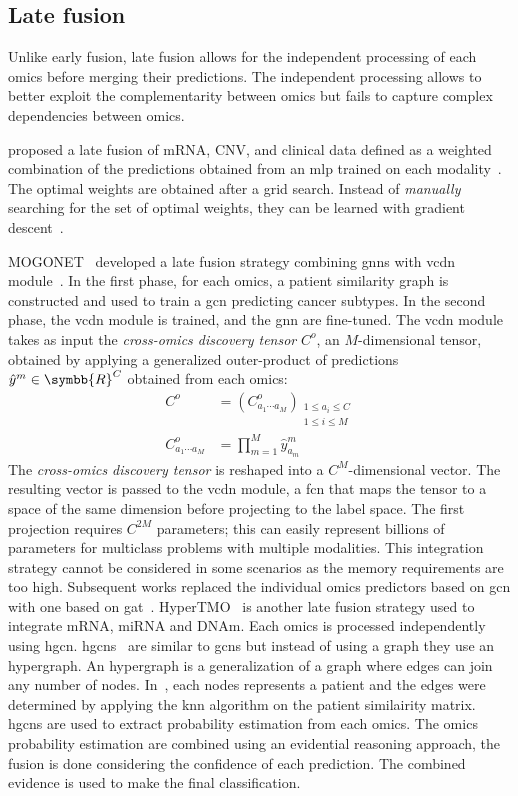 \documentclass[../main.tex]{subfiles}
\begin{document}
	\subsection{Late fusion}
		Unlike early fusion, late fusion allows for the independent processing of each omics before merging their predictions.
		The independent processing allows to better exploit the complementarity between omics but fails to capture complex dependencies between omics.

		\citeauthor{Sun2019} proposed a late fusion of mRNA, CNV, and clinical data defined as a weighted combination of the predictions obtained from an \gls{mlp} trained on each modality~\cite{Sun2019}.
		The optimal weights are obtained after a grid search.
		Instead of \emph{manually} searching for the set of optimal weights, they can be learned with gradient descent~\cite{CarrilloPerez2022}.

		MOGONET~\cite{MOGONET} developed a late fusion strategy combining \glspl{gnn} with \gls{vcdn} module~\cite{VCDN}.
		In the first phase, for each omics, a patient similarity graph is constructed and used to train a \gls{gcn} predicting cancer subtypes.
		In the second phase, the \gls{vcdn} module is trained, and the \gls{gnn} are fine-tuned.
		The \gls{vcdn} module takes as input the \emph{cross-omics discovery tensor} \(C^{o}\), an \(M\)-dimensional tensor, obtained by applying a generalized outer-product of predictions \(\hat{y}^{m} \in \symbb{R}^{C}\) obtained from each omics:
		\begin{align*}
			C^{o}                     & = {\left(C^{o}_{a_{1}\cdots a_{M}}\right)}_{\substack{1 \leq a_{i} \leq C \\ 1 \leq i \leq M}} \\
			C^{o}_{a_{1}\cdots a_{M}} & = \prod_{m=1}^{M}\hat{y}_{a_{m}}^{m}
		\end{align*}
		The \emph{cross-omics discovery tensor} is reshaped into a \(C^{M}\)-dimensional vector.
		The resulting vector is passed to the \gls{vcdn} module, a \gls{fcn} that maps the tensor to a space of the same dimension before projecting to the label space.
		The first projection requires \(C^{2M}\) parameters; this can easily represent billions of parameters for multiclass problems with multiple modalities.
		This integration strategy cannot be considered in some scenarios as the memory requirements are too high.
		Subsequent works replaced the individual omics predictors based on \gls{gcn} with one based on \gls{gat}~\cite{MODILM,Leng2022}.
		HyperTMO~\cite{Wang2024} is another late fusion strategy used to integrate mRNA, miRNA and DNAm.
		Each omics is processed independently using \gls{hgcn}.
		\Glspl{hgcn}~\cite{Feng2019} are similar to \glspl{gcn} but instead of using a graph they use an hypergraph.
		An hypergraph is a generalization of a graph where edges can join any number of nodes.
		In~\cite{Wang2024}, each nodes represents a patient and the edges were determined by applying the \gls{knn} algorithm on the patient similairity matrix.
		\Glspl{hgcn} are used to extract probability estimation from each omics.
		The omics probability estimation are combined using an evidential reasoning approach, the fusion is done considering the confidence of each prediction.
		The combined evidence is used to make the final classification.
\end{document}
